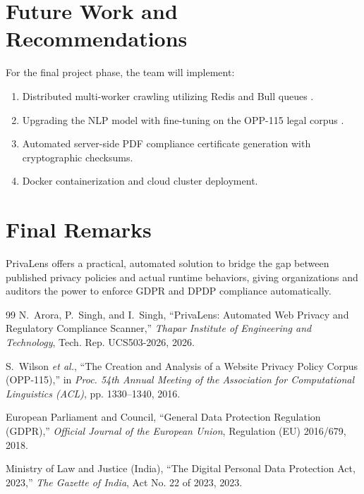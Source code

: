 \documentclass[12pt, a4paper, oneside]{report}
\begin{document}
\section{Future Work and Recommendations}
For the final project phase, the team will implement:
\begin{enumerate}
    \item Distributed multi-worker crawling utilizing Redis and Bull queues \cite{privalens2026}.
    \item Upgrading the NLP model with fine-tuning on the OPP-115 legal corpus \cite{opp115}.
    \item Automated server-side PDF compliance certificate generation with cryptographic checksums.
    \item Docker containerization and cloud cluster deployment.
\end{enumerate}

\section{Final Remarks}
PrivaLens offers a practical, automated solution to bridge the gap between published privacy policies and actual runtime behaviors, giving organizations and auditors the power to enforce GDPR and DPDP compliance automatically.

\begin{thebibliography}{99}
N.~Arora, P.~Singh, and I.~Singh, ``PrivaLens: Automated Web Privacy and Regulatory Compliance Scanner,'' \textit{Thapar Institute of Engineering and Technology}, Tech. Rep. UCS503-2026, 2026.

S.~Wilson \textit{et al.}, ``The Creation and Analysis of a Website Privacy Policy Corpus (OPP-115),'' in \textit{Proc. 54th Annual Meeting of the Association for Computational Linguistics (ACL)}, pp. 1330--1340, 2016.

European Parliament and Council, ``General Data Protection Regulation (GDPR),'' \textit{Official Journal of the European Union}, Regulation (EU) 2016/679, 2018.

Ministry of Law and Justice (India), ``The Digital Personal Data Protection Act, 2023,'' \textit{The Gazette of India}, Act No. 22 of 2023, 2023.
\end{thebibliography}
\end{document}
